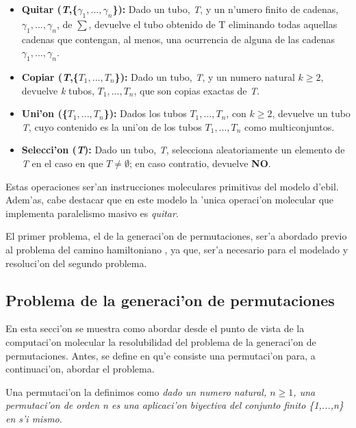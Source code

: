 \documentclass[12pt]{article}
\begin{document}
\begin{itemize}
    \item \textbf{Quitar (\textit{T},\{$ \gamma_{1},...,\gamma_{n} $\}):} Dado un tubo, \textit{T}, y un n'umero finito
    de cadenas, $ \gamma_{1},...,\gamma_{n} $, de $ \sum $, devuelve el tubo obtenido de T eliminando
    todas aquellas cadenas que contengan, al menos, una ocurrencia de alguna de las cadenas
    $ \gamma_{1},...,\gamma_{n} $.
    \item \textbf{Copiar (\textit{T},\{$ \textit{T}_{1},...,\textit{T}_{n} $\}):} Dado un tubo, \textit{T}, y un numero
    natural $ \textit{k} \geq 2 $, devuelve \textit{k} tubos, $\textit{T}_{1},...,\textit{T}_{n}$, que son
    copias exactas de \textit{T}.
    \item \textbf{Uni'on (\{$ \textit{T}_{1},...,\textit{T}_{n} $\}):} Dados los tubos
    $\textit{T}_{1},...,\textit{T}_{n}$, con $ \textit{k} \geq 2 $, devuelve un tubo \textit{T}, cuyo contenido
    es la uni'on de los tubos $\textit{T}_{1},...,\textit{T}_{n}$ como multiconjuntos.
    \item \textbf{Selecci'on (\textit{T}):} Dado un tubo, \textit{T}, selecciona aleatoriamente un elemento de \textit{T}
    en el caso en que $\textit{T} \neq \emptyset$; en caso contratio, devuelve \textbf{NO}.
\end{itemize}

Estas operaciones ser'an instrucciones moleculares primitivas del modelo d'ebil. Adem'as, cabe destacar que
en este modelo la 'unica operaci'on molecular que implementa paralelismo masivo es \textit{quitar}.

El primer problema, el de la generaci'on de permutaciones, ser'a abordado previo al problema del camino hamiltoniano
, ya que, ser'a necesario para el modelado y resoluci'on del segundo problema.

\subsection{Problema de la generaci'on de permutaciones}

En esta secci'on se muestra como abordar desde el punto de vista de la computaci'on molecular la resolubilidad
del problema de la generaci'on de permutaciones. Antes, se define en qu'e consiste una permutaci'on para, a
continuaci'on, abordar el problema.

Una permutaci'on la definimos como \textit{dado un numero natural, $n \geq 1$, una permutaci'on de orden n es una
aplicaci'on biyectiva del conjunto finito \{1,...,n\} en s'i mismo}.
\end{document}
